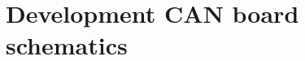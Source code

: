 %



\cleardoublepage
\pagestyle{plain}

\setcounter{page}{1}
\pagestyle{plain}
\setlength{\voffset}{\originalVOffset}
\setlength{\hoffset}{\originalHOffset}
\chapter{Development CAN board schematics}
\label{appendix:can_schematics}
\pagebreak

